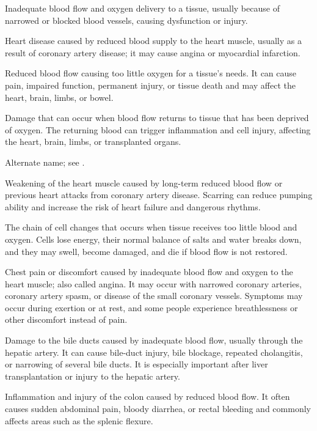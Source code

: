  Inadequate blood flow and oxygen delivery to a tissue, usually because of narrowed or blocked blood vessels, causing dysfunction or injury.

 Heart disease caused by reduced blood supply to the heart muscle, usually as a result of coronary artery disease; it may cause angina or myocardial infarction.

 Reduced blood flow causing too little oxygen for a tissue’s needs. It can cause pain, impaired function, permanent injury, or tissue death and may affect the heart, brain, limbs, or bowel.

 Damage that can occur when blood flow returns to tissue that has been deprived of oxygen. The returning blood can trigger inflammation and cell injury, affecting the heart, brain, limbs, or transplanted organs.

 Alternate name; see .

 Weakening of the heart muscle caused by long-term reduced blood flow or previous heart attacks from coronary artery disease. Scarring can reduce pumping ability and increase the risk of heart failure and dangerous rhythms.

 The chain of cell changes that occurs when tissue receives too little blood and oxygen. Cells lose energy, their normal balance of salts and water breaks down, and they may swell, become damaged, and die if blood flow is not restored.

 Chest pain or discomfort caused by inadequate blood flow and oxygen to the heart muscle; also called angina. It may occur with narrowed coronary arteries, coronary artery spasm, or disease of the small coronary vessels. Symptoms may occur during exertion or at rest, and some people experience breathlessness or other discomfort instead of pain.

 Damage to the bile ducts caused by inadequate blood flow, usually through the hepatic artery. It can cause bile-duct injury, bile blockage, repeated cholangitis, or narrowing of several bile ducts. It is especially important after liver transplantation or injury to the hepatic artery.

 Inflammation and injury of the colon caused by reduced blood flow. It often causes sudden abdominal pain, bloody diarrhea, or rectal bleeding and commonly affects areas such as the splenic flexure.

